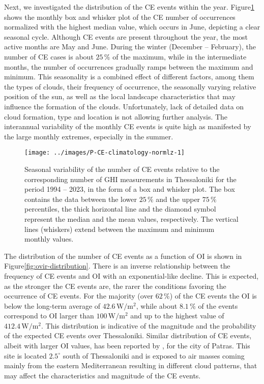 \documentclass[preprint, 5p,
authoryear]{elsarticle} %
\begin{document}
Next, we investigated the distribution of the CE events within the year.
Figure\nobreakspace{}\ref{fig:relative-month-occurrences} shows the
monthly box and whisker plot of the CE number of occurrences normalized
with the highest median value, which occurs in June, depicting a clear
seasonal cycle. Although CE events are present throughout the year, the
most active months are May and June. During the winter (December --
February), the number of CE cases is about \(25\,\%\) of the maximum,
while in the intermediate months, the number of occurrences gradually
ramps between the maximum and minimum. This seasonality is a combined
effect of different factors, among them the types of clouds, their
frequency of occurrence, the seasonally varying relative position of the
sun, as well as the local landscape characteristics that may influence
the formation of the clouds. Unfortunately, lack of detailed data on
cloud formation, type and location is not allowing further analysis. The
interannual variability of the monthly CE events is quite high as
manifested by the large monthly extremes, especially in the summer.

\begin{figure}

{\centering \texttt{[image: ../images/P-CE-climatology-normlz-1]} 

}

\caption{Seasonal variability of the number of CE events relative to the corresponding number of GHI measurements in Thessaloniki for the period 1994 -- 2023, in the form of a box and whisker plot. The box contains the data between the lower $25\,\%$ and the upper $75\,\%$ percentiles, the thick horizontal line and the diamond symbol represent the median and the mean values, respectively. The vertical lines (whiskers) extend between the maximum and minimum monthly values.}\label{fig:relative-month-occurrences}
\end{figure}

The distribution of the number of CE events as a function of OI is shown
in Figure\nobreakspace{}\ref{fig:ovir-distribution}. There is an inverse
relationship between the frequency of CE events and OI with an
exponential-like decline. This is expected, as the stronger the CE
events are, the rarer the conditions favoring the occurrence of CE
events. For the majority (over \(62\,\%\)) of the CE events the OI is
below the long-term average of \(42.6\,\text{W}/\text{m}^2\), while
about \(8.1\,\%\) of the events correspond to OI larger than
\(100\,\text{W}/\text{m}^2\) and up to the highest value of
\(412.4\,\text{W}/\text{m}^2\). This distribution is indicative of the
magnitude and the probability of the expected CE events over
Thessaloniki. Similar distribution of CE events, albeit with larger OI
values, has been reported by \citet{Vamvakas2020}, for the city of
Patras. This site is located \(2.5^\circ\) south of Thessaloniki and is
exposed to air masses coming mainly from the eastern Mediterranean
resulting in different cloud patterns, that may affect the
characteristics and magnitude of the CE events.
\end{document}
